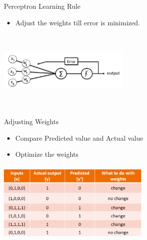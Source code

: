 \documentclass[aspectratio=169,14pt,usenames,dvipsnames]{beamer}
\begin{document}
\begin{frame}{Perceptron Learning Rule}
\begin{itemize}
\item Adjust the weights till error is minimized.
\end{itemize}
\centering
\includegraphics[width=6.5cm , height=4.0cm]{Images/AIML_Percep_IMG5.png}
\end{frame}

\begin{frame}{Adjusting Weights}
\begin{itemize}
\item Compare Predicted value and Actual value
\item Optimize the weights
\end{itemize}
\centering
\includegraphics[width=7.5cm , height=4.0cm]{Images/AIML_Percep_IMG6.png}
\end{frame}
\end{document}
